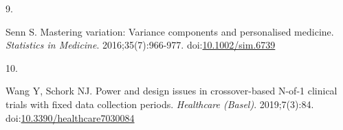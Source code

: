 \documentclass[
  11pt,
]{article}
\newlength{\cslhangindent}
\newlength{\csllabelwidth}
\newenvironment{CSLReferences}[2] %
 {\begin{list}{}{%
  \setlength{\itemindent}{0pt}
  \setlength{\leftmargin}{0pt}
  \setlength{\parsep}{0pt}
  \ifodd #1
   \setlength{\leftmargin}{\cslhangindent}
   \setlength{\itemindent}{-1\cslhangindent}
  \fi
  \setlength{\itemsep}{#2\baselineskip}}}
 {\end{list}}
\newcommand{\CSLLeftMargin}[1]{\parbox[t]{\csllabelwidth}{\strut#1\strut}}
\newcommand{\CSLRightInline}[1]{\parbox[t]{\linewidth - \csllabelwidth}{\strut#1\strut}}
\begin{document}
\begin{CSLReferences}{0}{1}
\CSLLeftMargin{9. }%
\CSLRightInline{Senn S. Mastering variation: Variance components and personalised medicine. \emph{Statistics in Medicine}. 2016;35(7):966-977. doi:\href{https://doi.org/10.1002/sim.6739}{10.1002/sim.6739}}

\CSLLeftMargin{10. }%
\CSLRightInline{Wang Y, Schork NJ. Power and design issues in crossover-based {N}-of-1 clinical trials with fixed data collection periods. \emph{Healthcare (Basel)}. 2019;7(3):84. doi:\href{https://doi.org/10.3390/healthcare7030084}{10.3390/healthcare7030084}}

\end{CSLReferences}
\end{document}
